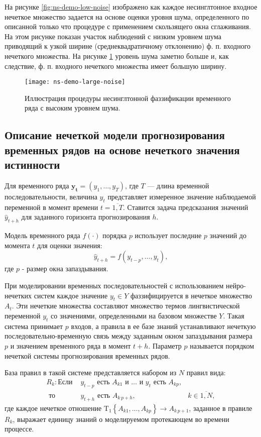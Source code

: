 На рисунке \cref{fig:ns-demo-low-noise} изображено как каждое несинглтонное входное нечеткое множество задается на основе оценки уровня шума, определенного по описанной только что процедуре с применением скользящего окна сглаживания. На этом рисунке показан участок наблюдений с низким уровнем шума приводящий к узкой ширине (среднеквадратичному отклонению) ф. п. входного нечеткого множества. На рисунке \cref{fig:ns-demo-large-noise} уровень шума заметно больше и, как следствие, ф. п. входного нечеткого множества имеет большую ширину.

\begin{figure}[bth]
	\centering
	\texttt{[image: ns-demo-large-noise]}
	\caption{Иллюстрация процедуры несинглтонной фаззификации временного ряда с высоким уровнем шума.}
	\label{fig:ns-demo-large-noise}
\end{figure}

\subsection{Описание нечеткой модели прогнозирования временных рядов на основе нечеткого значения истинности}

Для временного ряда $\mathbf{y_t} = (y_1, \dots, y_T)$, где $T$ --- длина временной последовательности, величина $y_t$ представляет измеренное значение наблюдаемой переменной в момент времени $t=\overline{1,T}$. Ставится задача предсказания значений $\hat{y}_{t+h}$ для заданного горизонта прогнозирования $h$.

Модель временного ряда $f(\cdot)$ порядка $p$ использует последние $p$ значений до момента $t$ для оценки значения:
\[
\hat{y}_{t+h} = f(y_{t-p}, \dots, y_t),
\]
где $p$ - размер окна запаздывания.

При моделировании временных последовательностей с использованием нейро-нечетких систем каждое значение $y_t\in Y$ фаззифицируется в нечеткое множество $A_t$. Эти нечеткие множества составляют множество термов лингвистической переменной $y_t$ со значениями, определенными на базовом множестве $Y$. Такая система принимает $p$ входов, а правила в ее базе знаний устанавливают нечеткую последовательно-временную связь между заданным окном запаздывания размера $p$ и значением временного ряда в момент $t+h$. Параметр $p$ называется порядком нечеткой системы прогнозирования временных рядов.

База правил в такой системе представляется набором из $N$ правил вида:
\begin{equation}
	\begin{aligned}
		R_k: \textrm{Если }&y_{t-p}\textrm{ есть }A_{k1}\textrm{ и }\dots\textrm{ и } y_{t}\textrm{ есть }A_{kp},&\\
		\textrm{ то }&y_{t+h}\textrm{ есть }A_{k\,p+h},&k\in\overline{1,N},
	\end{aligned}
	\label{eqn:fts-rules}
\end{equation}
где каждое нечеткое отношение $\mathrm{T_1}\left\{A_{k1}, \dots, A_{kp}\right\} \rightarrow A_{k\,p+1}$, заданное в правиле $R_k$, выражает единицу  знаний о моделируемом протекающем во времени процессе.


